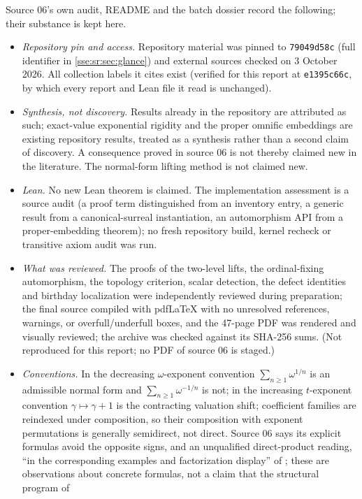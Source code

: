 \documentclass[11pt,a4paper]{article}
\numberwithin{equation}{section}
\theoremstyle{plain}
\theoremstyle{definition}
\theoremstyle{remark}
\newcommand{\code}[1]{\texttt{\small #1}}
\begin{document}
Source 06's own audit, README and the batch dossier record the following; their
substance is kept here.
\begin{itemize}
\item \emph{Repository pin and access.} Repository material was pinned to
\code{79049d58c} (full identifier in \cref{sse:sr:sec:glance}) and external
sources checked on
3 October 2026. All collection labels it cites exist (verified for this report
at \code{e1395c66c}, by which every report and Lean file it read is unchanged).
\item \emph{Synthesis, not discovery.} Results already in the repository are
attributed as such; exact-value exponential rigidity and the proper omnific
embeddings are existing repository results, treated as a synthesis rather than
a second claim of discovery. A consequence proved in source 06 is not thereby
claimed new in the literature. The normal-form lifting method is not claimed new.
\item \emph{Lean.} No new Lean theorem is claimed. The implementation assessment
is a source audit (a proof term distinguished from an inventory entry, a generic
result from a canonical-surreal instantiation, an automorphism API from a
proper-embedding theorem); no fresh repository build, kernel recheck or
transitive axiom audit was run.
\item \emph{What was reviewed.} The proofs of the two-level lifts, the
ordinal-fixing automorphism, the topology criterion, scalar detection, the
defect identities and birthday localization were independently reviewed during
preparation; the final source compiled with pdfLaTeX with no unresolved
references, warnings, or overfull/underfull boxes, and the 47-page PDF was
rendered and visually reviewed; the archive was checked against its SHA-256
sums. (Not reproduced for this report; no PDF of source 06 is staged.)
\item \emph{Conventions.} In the decreasing $\omega$-exponent convention
$\sum_{n\ge1}\omega^{1/n}$ is an admissible normal form and
$\sum_{n\ge1}\omega^{-1/n}$ is not; in the increasing $t$-exponent convention
$\gamma\mapsto\gamma+1$ is the contracting valuation shift; coefficient families
are reindexed under composition, so their composition with exponent permutations
is generally semidirect, not direct. Source 06 says its explicit formulas avoid
the opposite signs, and an unqualified direct-product reading, ``in the
corresponding examples and factorization display'' of \cite{KKS}; these are
observations about concrete formulas, not a claim that the structural program of

\end{itemize}
\end{document}
